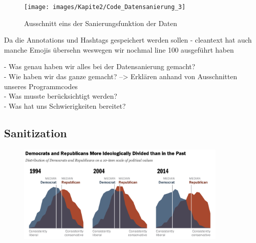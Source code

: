 	\begin{figure}[ht]
		\centering
		\texttt{[image: images/Kapite2/Code\_Datensanierung\_3]}
		\caption{\label{fig:DataSanF1}Ausschnitt eins der Sanierungsfunktion der Daten}
	\end{figure}

	Da die Annotations und Hashtags gespeichert werden sollen
	- cleantext hat auch manche Emojis übersehn weswegen wir nochmal line 100 ausgeführt haben	
	
	- Was genau haben wir alles bei der Datensanierung gemacht?\\
	- Wie haben wir das ganze gemacht? --> Erklären anhand von Ausschnitten unseres Programmcodes\\
	
	- Was musste berücksichtigt werden?\\
	- Was hat uns Schwierigkeiten bereitet?	
	
	
	\subsection{Sanitization}
	

	
	\begin{figure}[ht]
		\centering
		\includegraphics[width=0.9\textwidth]{images/Kapitel1/PoliticalPolarization}
	\end{figure}
	
	
